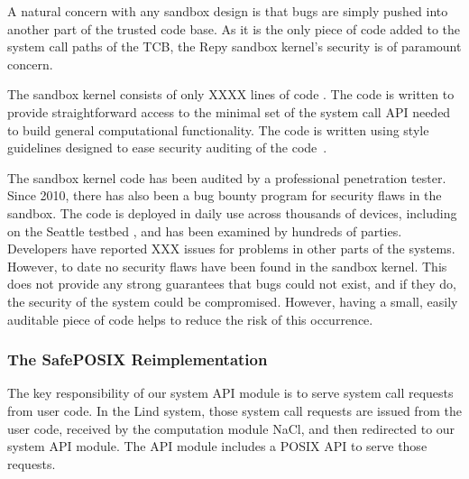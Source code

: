 
A natural concern with any sandbox design is that bugs are simply pushed into
another part of the trusted code base.  As it is the only piece of code added
to the system call paths of the TCB, the Repy sandbox kernel's security is of
paramount concern.

The sandbox kernel consists of only XXXX lines of code .
The code is written to provide straightforward access to the minimal set
of the system call API needed to build general computational functionality.
The code is written using style guidelines designed to ease security auditing
 of the code~\cite{style}.

The sandbox kernel code has been
audited by a professional penetration tester.  Since 2010, there has also been
a bug bounty program for security flaws in the sandbox.
The code is deployed in daily use across thousands of devices,
including on the Seattle testbed \cite{seattle}, and has been examined by
hundreds of parties.  Developers have reported
XXX issues for problems in other parts of the systems. However, to date
no security flaws have been found in the sandbox kernel.
This does not provide any strong guarantees that bugs could not exist, and if
they do, the security of the system could be compromised.
However, having a small, easily auditable piece of code helps to reduce the
risk of this occurrence.

\subsubsection{The SafePOSIX Reimplementation}

The key responsibility of our system API module is to serve system call requests from user code.
In the Lind system, those system call requests are issued from the user code,
received by the computation module NaCl, and then redirected to our system API module.
The API module includes a POSIX API to serve those requests.

